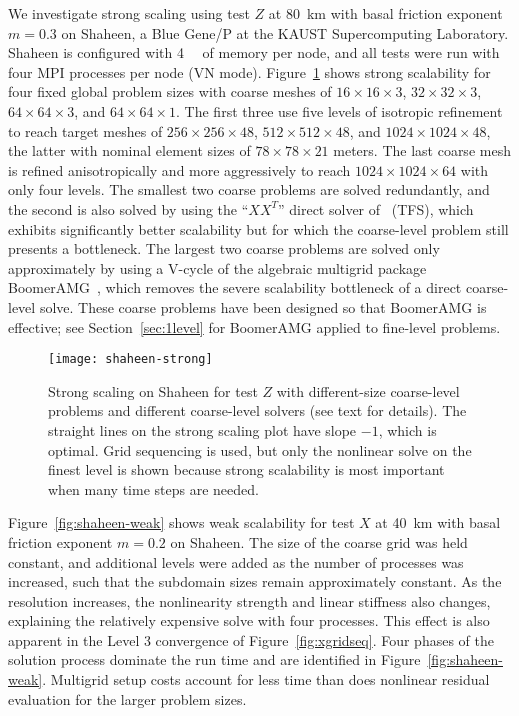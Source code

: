 We investigate strong scaling using test $Z$ at \SI{80}{\kilo\metre} with basal friction exponent $m= 0.3$ on Shaheen, a Blue Gene/P at the KAUST Supercomputing Laboratory.
Shaheen is configured with \SI{4}{\giga\byte} of memory per node, and all tests were run with four MPI processes per node (VN mode).
Figure~\ref{fig:shaheen-strong} shows strong scalability for four fixed global problem sizes with coarse meshes of $16\times 16\times 3$, $32\times 32\times 3$, $64\times 64\times 3$, and $64\times 64\times 1$.
The first three use five levels of isotropic refinement to reach target meshes of $256\times 256\times 48$, $512\times 512\times 48$, and $1024\times 1024\times 48$, the latter with nominal element sizes of $78\times 78\times 21$ meters.
The last coarse mesh is refined anisotropically and more aggressively to reach $1024\times 1024\times 64$ with only four levels.
The smallest two coarse problems are solved redundantly, and the second is also solved by using the ``$XX^T$'' direct solver of~\citet{tufo2001fast} (TFS), which exhibits significantly better scalability but for which the coarse-level problem still presents a bottleneck.
The largest two coarse problems are solved only approximately by using a V-cycle of the algebraic multigrid package BoomerAMG~\citep{henson2002bpa}, which removes the severe scalability bottleneck of a direct coarse-level solve.
These coarse problems have been designed so that BoomerAMG is effective; see Section~\ref{sec:1level} for BoomerAMG applied to fine-level problems.

\begin{figure}
  \centering\texttt{[image: shaheen-strong]}
  \caption{Strong scaling on Shaheen for test $Z$ with different-size coarse-level problems and different coarse-level solvers (see text for details).
    The straight lines on the strong scaling plot have slope $-1$, which is optimal.
    Grid sequencing is used, but only the nonlinear solve on the finest level is shown because strong scalability is most important when many time steps are needed.}\label{fig:shaheen-strong}
\end{figure}

Figure~\ref{fig:shaheen-weak} shows weak scalability for test $X$ at \SI{40}{\kilo\metre} with basal friction exponent $m=0.2$ on Shaheen.
The size of the coarse grid was held constant, and additional levels were added as the number of processes was increased, such that the subdomain sizes remain approximately constant.
As the resolution increases, the nonlinearity strength and linear stiffness also changes, explaining the relatively expensive solve with four processes.
This effect is also apparent in the Level 3 convergence of Figure~\ref{fig:xgridseq}.
Four phases of the solution process dominate the run time and are identified in Figure~\ref{fig:shaheen-weak}.
Multigrid setup costs account for less time than does nonlinear residual evaluation for the larger problem sizes.

